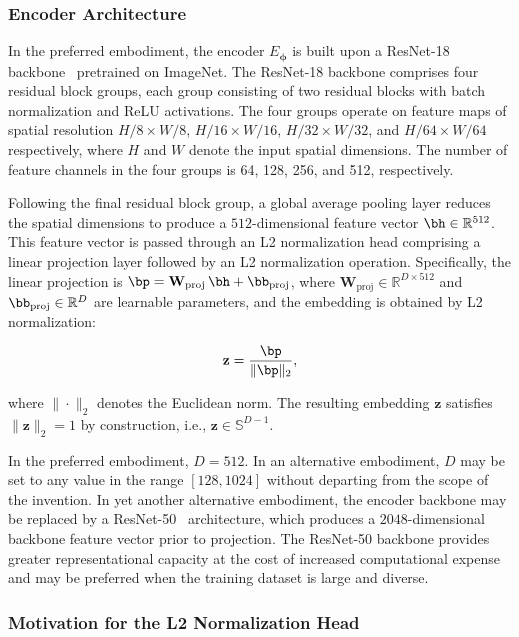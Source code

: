 \documentclass[12pt,letterpaper]{article}
\newcommand{\bz}{\mathbf{z}}
\newcommand{\bphi}{\bm{\phi}}
\newcommand{\RR}{\mathbb{R}}
\begin{document}
\subsubsection{Encoder Architecture}

In the preferred embodiment, the encoder $E_{\bphi}$ is built upon a
ResNet-18 backbone~\cite{he2016} pretrained on ImageNet. The ResNet-18
backbone comprises four residual block groups, each group consisting of two
residual blocks with batch normalization and ReLU activations. The four groups
operate on feature maps of spatial resolution $H/8 \times W/8$,
$H/16 \times W/16$, $H/32 \times W/32$, and $H/64 \times W/64$ respectively,
where $H$ and $W$ denote the input spatial dimensions. The number of feature
channels in the four groups is 64, 128, 256, and 512, respectively.

Following the final residual block group, a global average pooling layer reduces
the spatial dimensions to produce a $512$-dimensional feature vector $\bh \in
\RR^{512}$. This feature vector is passed through an L2 normalization head
comprising a linear projection layer followed by an L2 normalization operation.
Specifically, the linear projection is $\bp = \mathbf{W}_{\text{proj}}\,\bh +
\bb_{\text{proj}}$, where $\mathbf{W}_{\text{proj}} \in \RR^{D \times 512}$ and
$\bb_{\text{proj}} \in \RR^D$ are learnable parameters, and the embedding is
obtained by L2 normalization:

\begin{equation}
  \bz = \frac{\bp}{\|\bp\|_2},
  \label{eq:l2norm}
\end{equation}

\noindent where $\|\cdot\|_2$ denotes the Euclidean norm. The resulting
embedding $\bz$ satisfies $\|\bz\|_2 = 1$ by construction, i.e., $\bz \in
\mathbb{S}^{D-1}$.

In the preferred embodiment, $D = 512$. In an alternative embodiment, $D$ may
be set to any value in the range $[128, 1024]$ without departing from the scope
of the invention. In yet another alternative embodiment, the encoder backbone
may be replaced by a ResNet-50~\cite{he2016} architecture, which produces a
$2048$-dimensional backbone feature vector prior to projection. The ResNet-50
backbone provides greater representational capacity at the cost of increased
computational expense and may be preferred when the training dataset is large
and diverse.

\subsubsection{Motivation for the L2 Normalization Head}
\end{document}
